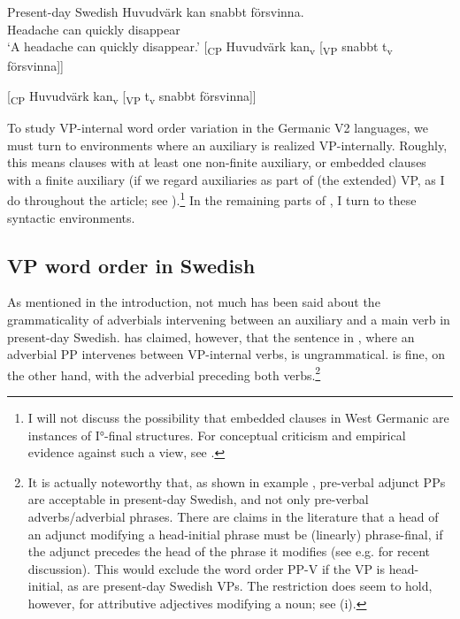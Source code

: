 \documentclass[output=paper, colorlinks, citecolor=brown]{langscibook}
\begin{document}
\ea Present-day Swedish\label{ex:sangfelt:14}
\ea \label{ex:sangfelt:14a}
\gll Huvudvärk kan {snabbt} försvinna.  \\
 Headache can quickly disappear \\
\glt ‘A headache can quickly disappear.’
\ex\label{ex:sangfelt:14b}
[\textsubscript{CP} Huvudvärk kan\textsubscript{v} [\textsubscript{VP} snabbt t\textsubscript{v} försvinna]]

[\textsubscript{CP} Huvudvärk kan\textsubscript{v} [\textsubscript{VP} t\textsubscript{v} snabbt försvinna]]
\z 
\z

To study VP-internal word order variation in the Germanic V2 languages, we must turn to environments where an auxiliary is realized VP-internally. Roughly, this means clauses with at least one non-finite auxiliary, or embedded clauses with a finite auxiliary (if we regard auxiliaries as part of (the extended) VP, as I do throughout the article; see ).\footnote{I will not discuss the possibility that embedded clauses in West Germanic are instances of I°-final structures. For conceptual criticism and empirical evidence against such a view, see \citet[54–68]{Haider2010}.} In the remaining parts of , I turn to these syntactic environments.

\subsection{VP word order in Swedish}\label{sec:sangfelt:3.2}

As mentioned in the introduction, not much has been said about the grammaticality of adverbials intervening between an auxiliary and a main verb in present-day Swedish. \citet[157]{Petzell2011} has claimed, however, that the sentence in , where an adverbial PP intervenes between VP-internal verbs, is ungrammatical.  is fine, on the other hand, with the adverbial preceding both verbs.\footnote{It is actually noteworthy that, as shown in example , pre-verbal adjunct PPs are acceptable in present-day Swedish, and not only pre-verbal adverbs\slash adverbial phrases. There are claims in the literature that a head of an adjunct modifying a head-initial phrase must be (linearly) phrase-final, if the adjunct precedes the head of the phrase it modifies (see e.g. \citet{Haider_left-left_nodate} for recent discussion). This would exclude the word order PP-V if the VP is head-initial, as are present-day Swedish VPs. The restriction does seem to hold, however, for attributive adjectives modifying a noun; see (i). 
\z}
\end{document}
